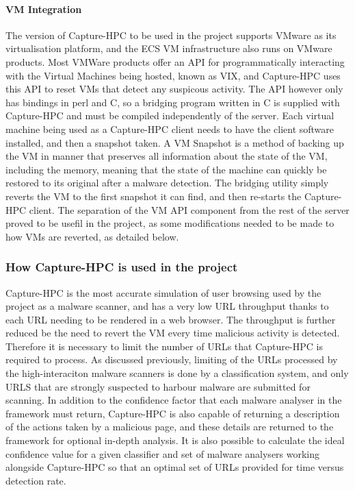 \paragraph{VM Integration}
The version of Capture-HPC to be used in the project supports VMware as its
virtualisation platform, and the ECS VM infrastructure also runs on VMware
products. Most VMWare products offer an API for programmatically interacting
with the Virtual Machines being hosted, known as VIX, and Capture-HPC uses this
API to reset VMs that detect any suspicous activity. The API however only has
bindings in perl and C,
so a bridging program written in C is supplied with Capture-HPC and must be
compiled independently of the server. Each virtual machine being used as a
Capture-HPC client needs to have the client software installed, and then a
snapshot taken. A VM Snapshot is a method of backing up the VM in manner that
preserves all information about the state of the VM, including the memory,
meaning that the state of the machine can quickly be restored to its original
after a malware detection. The bridging utility simply reverts the VM to the
first snapshot it can find, and then re-starts the Capture-HPC client. The
separation of the VM API component from the rest of the server proved to be
usefil in the project, as some modifications needed to be made to how VMs are
reverted, as detailed below.

\subsubsection{How Capture-HPC is used in the project}

Capture-HPC is the most accurate simulation of user browsing used by the project
as a malware scanner, and has a very low URL throughput thanks to each URL
needing to be rendered in a web browser. The throughput is further reduced be
the need to revert the VM every time malicious activity is detected. Therefore
it is necessary to limit the number of URLs that Capture-HPC is required to
process. As discussed previously, limiting of the URLs processed by the
high-interaciton malware scanners 
is done by a classification system, and only URLS that are strongly suspected to
harbour malware are submitted for scanning. In addition to the confidence factor
that each malware analyser in the framework must return, Capture-HPC is also
capable of returning a description of the actions taken by a malicious page, and
these details are returned to the framework for optional in-depth analysis. It
is also possible to calculate the ideal confidence value for a given classifier
and set of malware analysers working alongside Capture-HPC so that an optimal
set of URLs provided for time versus detection rate.

